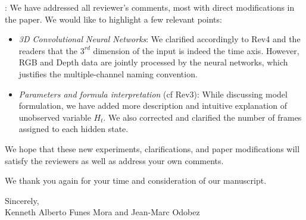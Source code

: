 \documentclass[12pt]{article}
\begin{document}
: We have addressed all reviewer's comments, most with direct modifications in the paper. We would like to
highlight a few relevant points:
\begin{itemize}
%
 \item {\em 3D Convolutional Neural Networks}: We clarified accordingly to Rev4 and the readers that the $3^{rd}$ dimension of the input is indeed the time axis. However, RGB and Depth data are jointly processed by the neural networks, which justifies the multiple-channel naming convention.
%
 \item {\em Parameters and formula interpretation} (cf Rev3): While discussing model formulation, we have added more description and intuitive explanation of unobserved variable $\ensuremath{H}\xspace_t$. We also corrected and clarified the number of frames assigned to each hidden state.
\end{itemize}

We hope that these new experiments, clarifications, and paper modifications will satisfy the reviewers as well as address your own comments. 

\vspace*{2mm}
We thank you again for your time and consideration of our manuscript.




\vspace*{8mm}

\noindent Sincerely,\\[3mm]
%
Kenneth Alberto Funes Mora and Jean-Marc Odobez



\newpage
\end{document}
